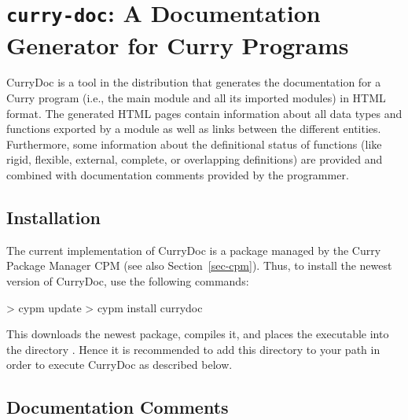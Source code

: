 \section{\texttt{curry-doc}: A Documentation Generator for Curry Programs}

CurryDoc%
is a tool in the \CYS distribution that generates
the documentation for a Curry program (i.e., the main module
and all its imported modules) in HTML format.
The generated HTML pages contain information about
all data types and functions exported by a module as well
as links between the different entities.
Furthermore, some information about the definitional status
of functions (like rigid, flexible, external, complete, or
overlapping definitions) are provided and combined with
documentation comments provided by the programmer.

\subsection{Installation}

The current implementation of CurryDoc is a package
managed by the Curry Package Manager CPM
(see also Section~\ref{sec-cpm}).
Thus, to install the newest version of CurryDoc, use the following commands:
%
\begin{curry}
> cypm update
> cypm install currydoc
\end{curry}
%
This downloads the newest package, compiles it, and places
the executable  into the directory .
Hence it is recommended to add this directory to your path
in order to execute CurryDoc as described below.

\subsection{Documentation Comments}

